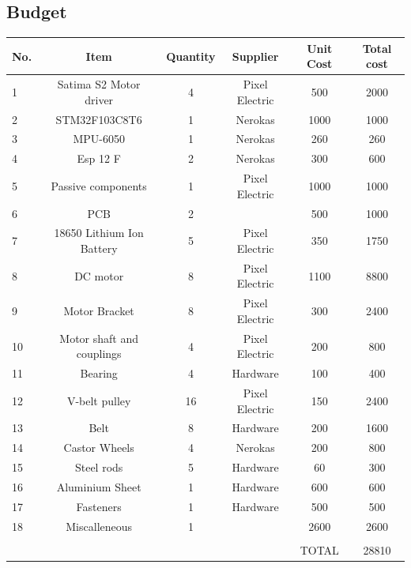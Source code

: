 \subsection{Budget}
\begin{table}[H]
  \begin{center}
    \leavevmode
     \begin{tabular}{| l | c | c | c | c | c |}\hline
No. & Item & Quantity & Supplier & Unit Cost & Total cost \\\hline
1 & Satima S2 Motor driver & 4 & Pixel Electric & 500 & 2000 \\\hline
2 & STM32F103C8T6 & 1 & Nerokas & 1000 & 1000 \\\hline
3 & MPU-6050 & 1 & Nerokas & 260 & 260 \\\hline
4 & Esp 12 F & 2 & Nerokas & 300 & 600 \\\hline
5 & Passive components & 1 & Pixel Electric & 1000 & 1000 \\\hline
6 & PCB & 2 & & 500 & 1000 \\\hline
7 & 18650 Lithium Ion Battery & 5 & Pixel Electric & 350 & 1750 \\\hline
8 & DC motor & 8 & Pixel Electric & 1100 & 8800 \\\hline
9 & Motor Bracket & 8 & Pixel Electric & 300 & 2400 \\\hline
10 & Motor shaft and couplings & 4 & Pixel Electric & 200 & 800 \\\hline
11 & Bearing & 4 & Hardware & 100 & 400 \\\hline
12 & V-belt pulley & 16 & Pixel Electric & 150 & 2400 \\\hline
13 & Belt & 8 & Hardware & 200 & 1600 \\\hline
14 & Castor Wheels & 4 & Nerokas & 200 & 800 \\\hline
15 & Steel rods & 5 & Hardware & 60 & 300 \\\hline
16 & Aluminium Sheet & 1 & Hardware & 600 & 600 \\\hline
17 & Fasteners & 1 & Hardware & 500 & 500 \\\hline
18 & Miscalleneous & 1 & & 2600 & 2600 \\\hline
& & & & & \\\hline
& & & & TOTAL & 28810 \\\hline
    \end{tabular}
    \label{table:1}
  \end{center}
\end{table}


